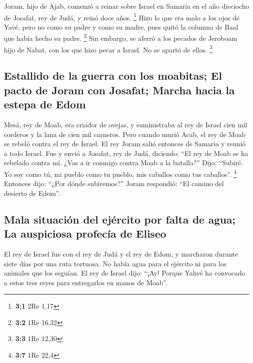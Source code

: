 \begin{paracol}{2}
 Joram, hijo de Ajab, comenzó a reinar sobre Israel en
Samaria en el año dieciocho de Josafat, rey de Judá, y reinó doce años.
\footnote{\textbf{3:1} 2Re 1,17}  Hizo lo que era malo a
los ojos de Yavé, pero no como su padre y como su madre, pues quitó la
columna de Baal que había hecho su padre. \footnote{\textbf{3:2} 1Re
  16,32}  Sin embargo, se aferró a los pecados de Jeroboam
hijo de Nabat, con los que hizo pecar a Israel. No se apartó de ellos.
\footnote{\textbf{3:3} 1Re 12,30}

\hypertarget{estallido-de-la-guerra-con-los-moabitas-el-pacto-de-joram-con-josafat-marcha-hacia-la-estepa-de-edom}{%
\subsection{Estallido de la guerra con los moabitas; El pacto de Joram
con Josafat; Marcha hacia la estepa de
Edom}\label{estallido-de-la-guerra-con-los-moabitas-el-pacto-de-joram-con-josafat-marcha-hacia-la-estepa-de-edom}}

 Mesá, rey de Moab, era criador de ovejas, y suministraba
al rey de Israel cien mil corderos y la lana de cien mil carneros.
 Pero cuando murió Acab, el rey de Moab se rebeló contra
el rey de Israel.  El rey Joram salió entonces de Samaria
y reunió a todo Israel.  Fue y envió a Josafat, rey de
Judá, diciendo: ``El rey de Moab se ha rebelado contra mí. ¿Vas a ir
conmigo contra Moab a la batalla?'' Dijo: ``Subiré. Yo soy como tú, mi
pueblo como tu pueblo, mis caballos como tus caballos''. \footnote{\textbf{3:7}
  1Re 22,4}  Entonces dijo: ``¿Por dónde subiremos?''
Joram respondió: ``El camino del desierto de Edom''.

\hypertarget{mala-situaciuxf3n-del-ejuxe9rcito-por-falta-de-agua-la-auspiciosa-profecuxeda-de-eliseo}{%
\subsection{Mala situación del ejército por falta de agua; La auspiciosa
profecía de
Eliseo}\label{mala-situaciuxf3n-del-ejuxe9rcito-por-falta-de-agua-la-auspiciosa-profecuxeda-de-eliseo}}

 El rey de Israel fue con el rey de Judá y el rey de Edom,
y marcharon durante siete días por una ruta tortuosa. No había agua para
el ejército ni para los animales que los seguían.  El rey
de Israel dijo: ``¡Ay! Porque Yahvé ha convocado a estos tres reyes para
entregarlos en manos de Moab''.


\end{paracol}
